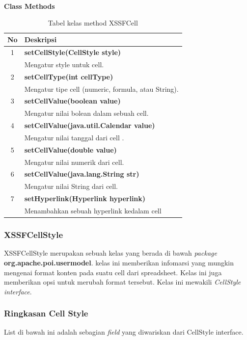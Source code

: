 \noindent \textbf{Class Methods}
\begin{table}[H]
		\centering
		\caption{Tabel kelas method XSSFCell}
		\label{tab:methodXSSFCell}
	\begin{tabular}{|c|p{12cm}|}
		\hline
		\textbf{No} & \textbf{Deskripsi} \\ \hline \hline
		1 & \textbf{setCellStyle(CellStyle style)}\\
			&	Mengatur style untuk cell.\\ \hline 
		2 & \textbf{setCellType(int cellType)}\\
			&	Mengatur tipe cell (numeric, formula, atau String).\\ \hline
		3 & \textbf{setCellValue(boolean value)}\\
			&	Mengatur nilai bolean dalam sebuah cell.\\ \hline
		4 & \textbf{setCellValue(java.util.Calendar value)}\\
			&	Mengatur nilai tanggal dari cell .\\ \hline	
		5 & \textbf{setCellValue(double value)}\\
			&	Mengatur nilai numerik dari cell.\\ \hline
		6 & \textbf{setCellValue(java.lang.String str)}\\
			&	Mengatur nilai String dari cell.\\ \hline
		7 & \textbf{setHyperlink(Hyperlink hyperlink)}\\
			&	Menambahkan sebuah hyperlink kedalam cell\\ \hline					
	\end{tabular}
\end{table}

\subsubsection{XSSFCellStyle}
\label{subs:XSSFCellStyle}
XSSFCellStyle merupakan sebuah kelas yang berada di bawah \textit{package} \textbf{org.apache.poi.usermodel}. kelas ini memberikan infomarsi yang mungkin mengenai format konten pada suatu cell dari spreadsheet. Kelas ini juga memberikan opsi untuk merubah format tersebut. Kelas ini mewakili \textit{CellStyle interface}.\cite{apachepoi2}

\subsubsection{Ringkasan Cell Style}
\label{subs:Ringkasan_Cell_Style}
List di bawah ini adalah sebagian \textit{field} yang diwariskan dari CellStyle interface.\cite{apachepoi2}\\

